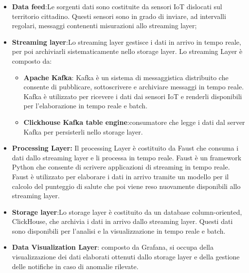 \begin{itemize}
    \item \textbf{Data feed}:Le sorgenti dati sono costituite da sensori IoT dislocati sul territorio cittadino. Questi sensori sono in grado di inviare, ad intervalli regolari, messaggi contenenti misurazioni allo streaming layer;
    \item \textbf{Streaming layer}:Lo streaming layer gestisce i dati in arrivo in tempo reale, per poi archiviarli sistematicamente nello storage layer. Lo streaming Layer è composto da:
    \begin{itemize}
        \item \textbf{Apache Kafka}: Kafka è un sistema di messaggistica distribuito che consente di pubblicare, sottoscrivere e archiviare messaggi in tempo reale. Kafka è utilizzato per ricevere i dati dai sensori IoT e renderli disponibili per l'elaborazione in tempo reale e batch.
        \item \textbf{Clickhouse Kafka table engine}:consumatore che legge i
        dati dal server Kafka per persisterli nello storage layer.
    \end{itemize}
    \item \textbf{Processing Layer:} Il processing Layer è costituito da Faust che consuma i dati dallo streaming layer e li processa in tempo reale. Faust è un framework Python che consente di scrivere applicazioni di streaming in tempo reale. Faust è utilizzato per elaborare i dati in arrivo tramite un modello per il calcolo del punteggio di salute che poi viene reso nuovamente disponibili allo streaming layer.
    \item \textbf{Storage layer}:Lo storage layer è costituito da un database column-oriented, ClickHouse, che archivia i dati in arrivo dallo streaming layer. Questi dati sono disponibili per l'analisi e la visualizzazione in tempo reale e batch.
    \item \textbf{Data Visualization Layer}: composto da Grafana, si occupa della visualizzazione dei dati elaborati ottenuti dallo storage layer e della gestione delle notifiche in caso di anomalie rilevate.
\end{itemize}





